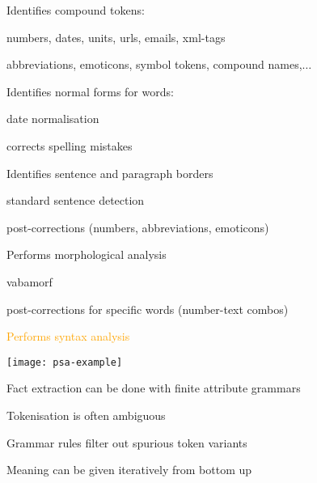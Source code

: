 \documentclass[landscape,footrule]{foils}
\begin{document}
\enlargethispage{1cm}
\begin{triangles}
\item Identifies compound tokens:\vspace*{0.5ex}
\begin{diamonds}
\item numbers, dates, units, urls, emails, xml-tags 
\item abbreviations, emoticons, symbol tokens, compound names,$\ldots$\vspace{1ex}
\end{diamonds}
\item Identifies normal forms for words:\vspace*{0.5ex}
\begin{diamonds}
\item date normalisation
\item \textcolor{red!90!black!100}{corrects spelling mistakes}\vspace{1ex}
\end{diamonds}
\item Identifies sentence and paragraph borders\vspace*{0.5ex}
\begin{diamonds}
\item standard sentence detection
\item post-corrections (numbers, abbreviations, emoticons)\vspace{1ex}
\end{diamonds}
\item Performs morphological analysis \vspace*{0.5ex}
\begin{diamonds}
\item vabamorf
\item post-corrections for specific words (number-text combos)\vspace{1ex}
\end{diamonds}
\item \textcolor{orange}{Performs syntax analysis}
\end{triangles}



\centerline{\texttt{[image: psa-example]}}

Fact extraction can be done with finite attribute grammars
\begin{triangles}
\item Tokenisation is often ambiguous
\item Grammar rules filter out spurious token variants
\item Meaning can be given iteratively from bottom up\vspace*{1cm}
\end{triangles}
\end{document}
